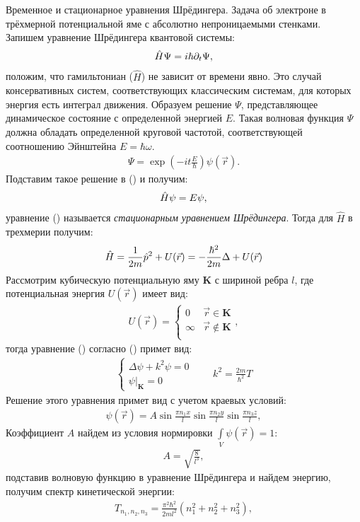 \documentclass[__main__.tex]{subfiles}
\begin{document}
Временное и стационарное уравнения Шрёдингера. Задача об электроне в трёхмерной потенциальной яме с абсолютно непроницаемыми стенками.\\ 

Запишем уравнение Шрёдингера квантовой системы:
\begin{gather}
\hat{H}\Psi=i\hbar\partial_{t}\Psi,
\llabel{k34:sh}
\end{gather}
положим, что гамильтониан ($\hat{H}$) не зависит от времени явно. Это случай консервативных систем, соответствующих классическим системам, для которых энергия есть интеграл движения. Образуем решение $\Psi$, представляющее динамическое состояние с определенной энергией $E$.
Такая волновая функция  $\Psi$ должна обладать определенной круговой частотой, соответствующей соотношению Эйнштейна $E=\hbar\omega$.
\begin{gather}
\Psi=\exp\left(-it\frac{E}{\hbar}\right)\psi(\vec{r}).
\end{gather}
Подставим такое решение в () и получим:
\begin{gather}
\hat{H}\psi=E\psi,
\llabel{k34:st}
\end{gather}
уравнение () называется \textit{стационарным уравнением Шрёдингера}. Тогда для $\hat{H}$ в трехмерии получим:
\begin{gather}
\hat{H}
=
\frac{1}{2m}\hat{p}^2+U(\vec{r})
=
-\frac{\hbar^2}{2m}\Delta+U(\vec{r})
\llabel{k34:ham}
\end{gather}
Рассмотрим кубическую потенциальную яму $\mathbf{K}$ с шириной ребра $l$, где потенциальная энергия $U(\vec{r})$ имеет вид:
\begin{gather*}
    U(\vec{r})
    =
    \begin{cases}
        0      & \vec{r}\in\mathbf{K}     \\
        \infty & \vec{r}\not\in\mathbf{K} \\
    \end{cases},
\end{gather*}
тогда уравнение () согласно () примет вид:
\begin{gather*}
\begin{cases}
\Delta\psi+k^2\psi=0\\
\left.\psi\right|_\mathbf{K}=0
\end{cases}
\qquad
k^2=\frac{2m}{\hbar^2}T
\end{gather*}
Решение этого уравнения примет вид с учетом краевых условий:
\begin{gather*}
\psi(\vec{r})
=
A\sin\frac{\pi{n_1}x}{l}\sin\frac{\pi{n_2}y}{l}\sin\frac{\pi{n_3}z}{l}, 
\end{gather*}
Коэффициент $A$ найдем из условия нормировки $\int\limits_{V}\psi(\vec{r})=1$:
\begin{gather*}
A=\sqrt{\frac{8}{l^3}},
\end{gather*}
подставив волновую функцию в уравнение Шрёдингера и найдем энергию, получим спектр кинетической энергии:
\begin{gather*}
T_{n_1,n_2,n_3}=\frac{\pi^2\hbar^2}{2ml^2}\left(n_1^2+n_2^2+n_3^2\right),
\end{gather*} 
\end{document}
